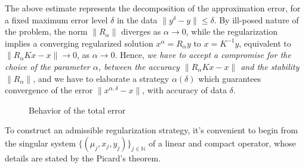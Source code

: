 \documentclass[10pt, a4paper, twoside, openright]{book}
\theoremstyle{definition}
\theoremstyle{plain}
\theoremstyle{plain}
\theoremstyle{plain}
\theoremstyle{plain}
\theoremstyle{plain}
\theoremstyle{plain}
\theoremstyle{plain}
\theoremstyle{plain}
\begin{document}
The above estimate represents the decomposition of the approximation error, for a fixed maximum error 
level $\delta$ in the data $\|y^\delta - y\|\leq \delta$. By ill-posed nature of the problem, the norm 
$\|R_\alpha\|$ diverges as $\alpha\to 0$, while the regularization implies a converging regularized 
solution $x^{\alpha} = R_\alpha y$ to $x=K^{-1}y$, equivalent to $\|R_\alpha Kx -x\|\to 0$, as $\alpha\to0$.
Hence, \emph{we have to accept a compromise for the choice of the parameter $\alpha$, between 
the accuracy $\|R_\alpha Kx -x\|$ and the stability $\|R_\alpha\|$}, and we have to elaborate a 
strategy $\alpha(\delta)$ which guarantees convergence of the error $\|x^{\alpha,\delta} - x\|$, 
with accuracy of data $\delta$.
\par
\begin{figure}[]
\begin{center}
\end{center}
\caption{Behavior of the total error}
\end{figure}
To construct an admissible regularization strategy, it's convenient to begin from the 
singular system $\{(\mu_j, x_j, y_j)\}_{j\in\mathbb{N}}$ of a linear and compact operator, 
whose details are stated by the Picard's theorem.
\end{document}
